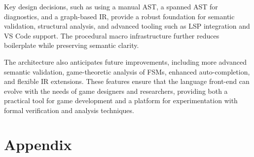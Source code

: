 \documentclass[a4paper,11pt]{article}
\begin{document}
Key design decisions, such as using a manual AST, a spanned AST for diagnostics, and a graph-based IR, provide a robust foundation for semantic validation, structural analysis, and advanced tooling such as LSP integration and VS Code support. The procedural macro infrastructure further reduces boilerplate while preserving semantic clarity.

The architecture also anticipates future improvements, including more advanced semantic validation, game-theoretic analysis of FSMs, enhanced auto-completion, and flexible IR extensions. These features ensure that the language front-end can evolve with the needs of game designers and researchers, providing both a practical tool for game development and a platform for experimentation with formal verification and analysis techniques.


\section{Appendix}
\end{document}
